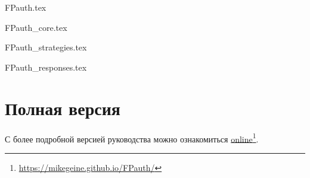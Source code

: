 \documentclass[a4paper, 12pt]{article}
\begin{document}
    \graphicspath{{images/}{images2/}} %
    \renewcommand{\figurename}{Рисунок}

    \author{М.А. Гейне}
    \bmstutitle

    \tableofcontents
    \pagebreak

    
    {FPauth.tex}
    \pagebreak

    
    {FPauth_core.tex}
    \pagebreak

    
    {FPauth_strategies.tex}
    \pagebreak

    
    {FPauth_responses.tex}
    \pagebreak

    \section{Полная версия}
    С более подробной версией руководства можно ознакомиться \href{https://mikegeine.github.io/FPauth/}{online}\footnote{\url{https://mikegeine.github.io/FPauth/}}.
    
\end{document}
